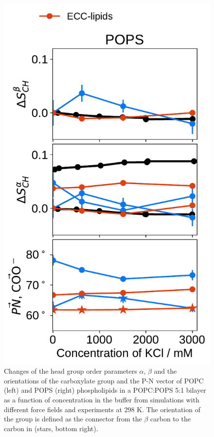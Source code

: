 \documentclass[journal=jpcbfk,manuscript=article]{achemso}
\newlength{\figheight}
\begin{document}
\begin{figure}[tbp!]
  \includegraphics[height=\figheight]{../img/ecc_pops/order_parameters_changes_ecc-lip_L14_A-B-PN-COO_POPS_kcl.pdf} 
  \caption{\label{fig:delta_ordPar_KCl_PCPS} 
    Changes of the head group order parameters $\alpha$, $\beta$ and the orientations of the carboxylate group and the P-N vector  
    of POPC (left) and POPS (right) phospholipids in a POPC:POPS 5:1 bilayer 
    as a function of  concentration in the buffer 
    from simulations with different force fields and experiments at 298 K. \citep{roux90}
    The orientation of the  group is defined as 
    the connector from the $\beta$ carbon to the carbon in  (stars, bottom right). 
  }
\end{figure} 
 
\end{document}
